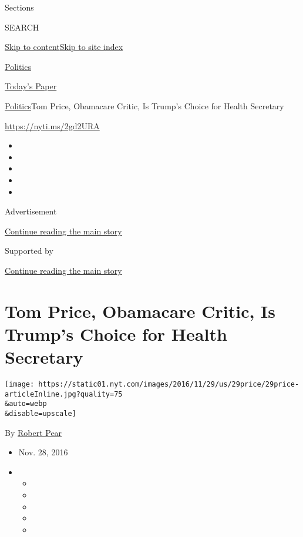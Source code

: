 Sections

SEARCH

\protect\hyperlink{site-content}{Skip to
content}\protect\hyperlink{site-index}{Skip to site index}

\href{https://www.nytimes.com/section/politics}{Politics}

\href{https://myaccount.nytimes.com/auth/login?response_type=cookie\&client_id=vi}{}

\href{https://www.nytimes.com/section/todayspaper}{Today's Paper}

\href{/section/politics}{Politics}\textbar{}Tom Price, Obamacare Critic,
Is Trump's Choice for Health Secretary

\url{https://nyti.ms/2gd2URA}

\begin{itemize}
\item
\item
\item
\item
\item
\end{itemize}

Advertisement

\protect\hyperlink{after-top}{Continue reading the main story}

Supported by

\protect\hyperlink{after-sponsor}{Continue reading the main story}

\hypertarget{tom-price-obamacare-critic-is-trumps-choice-for-health-secretary}{%
\section{Tom Price, Obamacare Critic, Is Trump's Choice for Health
Secretary}\label{tom-price-obamacare-critic-is-trumps-choice-for-health-secretary}}

\texttt{[image: https://static01.nyt.com/images/2016/11/29/us/29price/29price-articleInline.jpg?quality=75\\\&auto=webp\\\&disable=upscale]}

By \href{https://www.nytimes.com/by/robert-pear}{Robert Pear}

\begin{itemize}
\item
  Nov. 28, 2016
\item
  \begin{itemize}
  \item
  \item
  \item
  \item
  \item
  \end{itemize}
\end{itemize}

